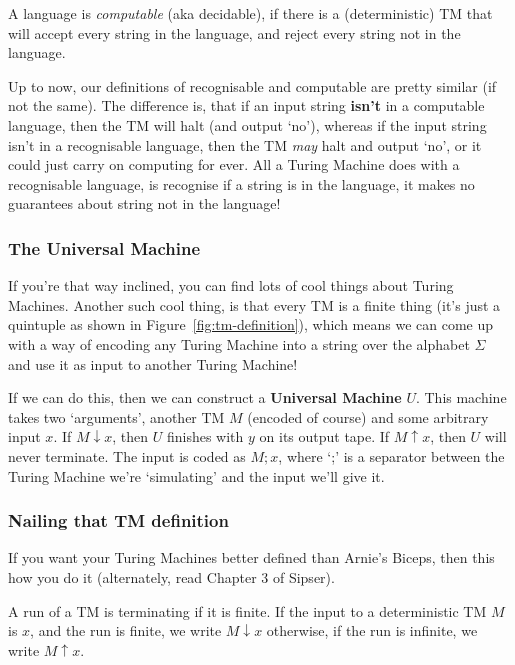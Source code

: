 A language is \textit{computable} (aka decidable), if there is a (deterministic)
TM that will accept every string in the language, and reject every string not in
the language.

Up to now, our definitions of recognisable and computable are pretty similar (if
not the same). The difference is, that if an input string \textbf{isn't} in a
computable language, then the TM will halt (and output `no'), whereas if the
input string isn't in a recognisable language, then the TM \textit{may} halt and
output `no', or it could just carry on computing for ever. All a Turing Machine
does with a recognisable language, is recognise if a string is in the language,
it makes no guarantees about string not in the language!

\subsubsection{The Universal Machine}

If you're that way inclined, you can find lots of cool things about Turing
Machines. Another such cool thing, is that every TM is a finite thing (it's just
a quintuple as shown in Figure~\ref{fig:tm-definition}), which means we can come
up with a way of encoding any Turing Machine into a string over the alphabet
$\Sigma$ and use it as input to another Turing Machine!

If we can do this, then we can construct a \textbf{Universal Machine} $U$. This
machine takes two `arguments', another TM $M$ (encoded of course) and some
arbitrary input $x$. If $M \downarrow x$, then $U$ finishes with $y$ on its
output tape. If $M \uparrow x$, then $U$ will never terminate. The input is
coded as $M;x$, where `;' is a separator between the Turing Machine we're
`simulating' and the input we'll give it.

\subsubsection{Nailing that TM definition}

If you want your Turing Machines better defined than Arnie's Biceps, then this
how you do it (alternately, read Chapter 3 of Sipser).


A run of a TM is terminating if it is finite. If the input to a deterministic TM
$M$ is $x$, and the run is finite, we write $M \downarrow x$ otherwise, if the
run is infinite, we write $M \uparrow x$.

